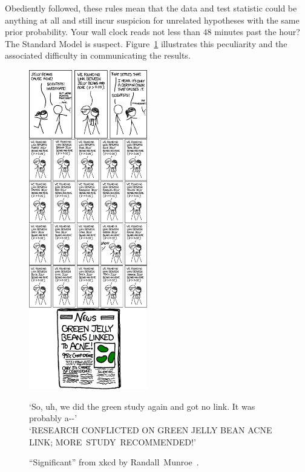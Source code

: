 Obediently followed, these rules mean that the data and test statistic could be
anything at all and still incur suspicion for unrelated hypotheses with the
same prior probability.
Your wall clock reads not less than $48$ minutes past the hour?
The Standard Model is suspect.
Figure~\ref{fig:searches_significant} illustrates this peculiarity and the
associated difficulty in communicating the results.

\begin{figure}[tp]
\centering
\includegraphics[width=0.46\textwidth]{figures/searches_significant_shrink.png}
\\
\begin{footnotesize}
`So, uh, we did the green study again and got no link. It was probably a{-}{-}'
\\
`RESEARCH CONFLICTED ON GREEN JELLY BEAN ACNE LINK; MORE~STUDY~RECOMMENDED!'
\end{footnotesize}
\caption[
``Significant'' from xkcd by Randall~Munroe
]{%
``Significant'' from xkcd by Randall~Munroe~\cite{xkcd2011significant}.
}
\label{fig:searches_significant}
\end{figure}


